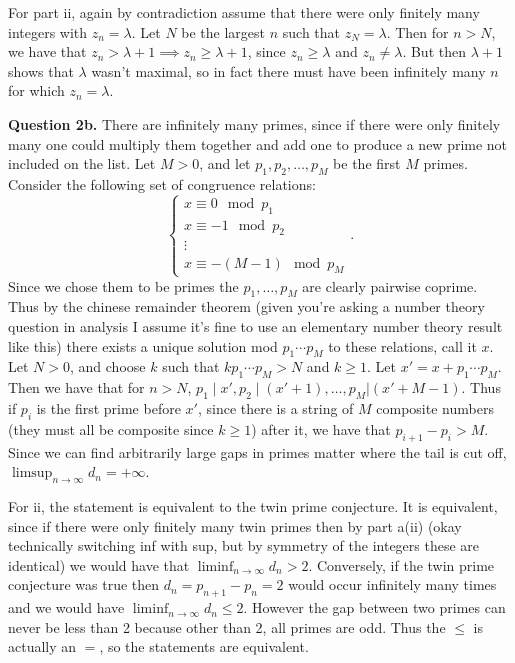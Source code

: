 \documentclass[letterpaper, reqno,11pt]{article}
\begin{document}
For part ii, again by contradiction assume that there were only finitely many integers with $z_n=\lambda$. Let $N$ be the largest $n$ such that $z_N=\lambda$. Then for $n>N$, we have that $z_n>\lambda+1\implies z_n\geq \lambda+1$, since $z_n\geq \lambda$ and $z_n\neq \lambda$. But then $\lambda+1$ shows that $\lambda$ wasn't maximal, so in fact there must have been infinitely many $n$ for which $z_n=\lambda$.

{\medskip\noindent\bf Question 2b.} There are infinitely many primes, since if there were only finitely many one could multiply them together and add one to produce a new prime not included on the list. Let $M>0$, and let $p_1,p_2,\ldots,p_M$ be the first $M$ primes. Consider the following set of congruence relations:
\[
\begin{cases}
    x\equiv 0\mod p_1\\
    x\equiv -1\mod p_2\\
    \vdots\\
    x\equiv -(M-1)\mod p_M
\end{cases}
.\]
Since we chose them to be primes the $p_1,\ldots,p_M$ are clearly pairwise coprime. Thus by the chinese remainder theorem (given you're asking a number theory question in analysis I assume it's fine to use an elementary number theory result like this) there exists a unique solution mod $p_1\cdots p_M$ to these relations, call it $x$. Let $N>0$, and choose $k$ such that $kp_1\cdots p_M>N$ and $k\geq 1$. Let $x' = x+p_1\cdots p_M$. Then we have that for $n>N$, $p_1\mid x', p_2\mid (x'+1),\ldots, p_M|\left( x'+M-1 \right) $. Thus if $p_i$ is the first prime before $x'$, since there is a string of $M$ composite numbers (they must all be composite since $k\geq 1$) after it, we have that $p_{i+1}-p_i>M$. Since we can find arbitrarily large gaps in primes matter where the tail is cut off, $\limsup_{n\to\infty}d_n=+\infty$.

For ii, the statement is equivalent to the twin prime conjecture. It is equivalent, since if there were only finitely many twin primes then by part a(ii) (okay technically switching inf with sup, but by symmetry of the integers these are identical) we would have that $\liminf_{n\to\infty}d_n>2$. Conversely, if the twin prime conjecture was true then $d_{n}=p_{n+1}-p_n=2$ would occur infinitely many times and we would have $\liminf_{n\to\infty}d_n\leq 2$. However the gap between two primes can never be less than 2 because other than 2, all primes are odd. Thus the $\leq$ is actually an $=$, so the statements are equivalent.
\end{document}
